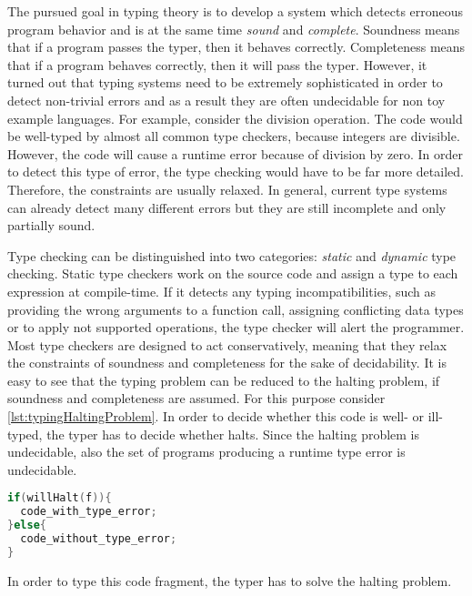 The pursued goal in typing theory is to develop a system which detects erroneous program behavior and is at the same time \emph{sound} and \emph{complete}.
Soundness means that if a program passes the typer, then it behaves correctly.
Completeness means that if a program behaves correctly, then it will pass the typer.
However, it turned out that typing systems need to be extremely sophisticated in order to detect non-trivial errors and as a result they are often undecidable for non toy example languages.
For example, consider the division operation.
The code  would be well-typed by almost all common type checkers, because integers are divisible.
However, the code will cause a runtime error because of division by zero.
In order to detect this type of error, the type checking would have to be far more detailed.
Therefore, the constraints are usually relaxed.
In general, current type systems can already detect many different errors but they are still incomplete and only partially sound.

Type checking can be distinguished into two categories: \emph{static} and \emph{dynamic} type checking.
Static type checkers work on the source code and assign a type to each expression at compile-time.
If it detects any typing incompatibilities, such as providing the wrong arguments to a function call, assigning conflicting data types or to apply not supported operations, the type checker will alert the programmer.
Most type checkers are designed to act conservatively, meaning that they relax the constraints of soundness and completeness for the sake of decidability.
It is easy to see that the typing problem can be reduced to the halting problem, if soundness and completeness are assumed.
For this purpose consider \cref{lst:typingHaltingProblem}.
In order to decide whether this code is well- or ill-typed, the typer has to decide whether  halts.
Since the halting problem is undecidable, also the set of programs producing a runtime type error is undecidable.
\begin{listing}[!h]
  \begin{CenteredBox}
    \begin{lstlisting}[language=C++,
    commentstyle=\color{black},
    stringstyle=\color{black},
    keywordstyle=\color{black}\bfseries,
    ]
if(willHalt(f)){
  code_with_type_error;
}else{
  code_without_type_error;
}
    \end{lstlisting}
  \end{CenteredBox}
  \caption{In order to type this code fragment, the typer has to solve the halting problem.}
  \label{lst:typingHaltingProblem}
\end{listing}

